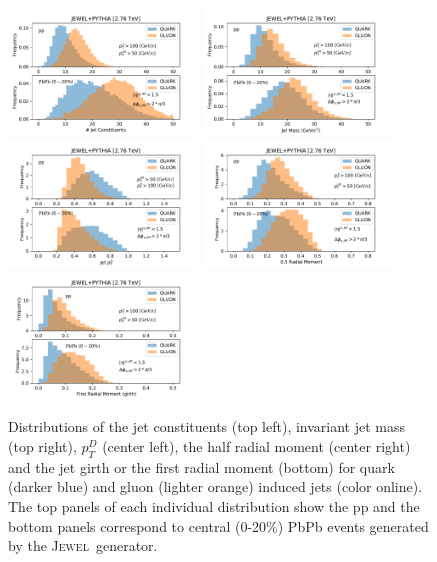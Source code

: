 \documentclass[notoc]{JHEP3}
\newcommand{\jw}{\textsc{Jewel}~}
\begin{document}
	\begin{figure}[h]
	   \centering
	   \includegraphics[width=0.45\textwidth]{plots/JEWEL_pp_pbpb020_NumberjetConstituents}
	   \includegraphics[width=0.45\textwidth]{plots/JEWEL_pp_pbpb020_jetMass}
	   \includegraphics[width=0.45\textwidth]{plots/JEWEL_pp_pbpb020_pTD}
	   \includegraphics[width=0.45\textwidth]{plots/JEWEL_pp_pbpb020_halfRadialMoment}
	   \includegraphics[width=0.45\textwidth]{plots/JEWEL_pp_pbpb020_firstRadialMoment}
	   \caption{Distributions of the jet constituents (top left), invariant jet mass (top right), $p^{D}_{T}$ (center left), the half radial moment (center right) and the jet girth or the first radial moment (bottom) for quark (darker blue) and gluon (lighter orange) induced jets (color online). The top panels of each individual distribution show the pp and the bottom panels correspond to central (0-20\%) PbPb events generated by the \jw generator.}
	   \label{fig:jetdistributons_pp_pbpb}
	\end{figure}
		
\end{document}
